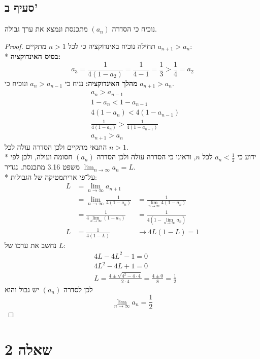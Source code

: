 \subsection{סעיף ב'}
נוכיח כי הסדרה $(a_n)$ מתכנסת ונמצא את ערך גבולה.
\begin{proof}
	תחילה נוכיח באינדוקציה כי לכל $n > 1$ מתקיים $a_{n + 1} > a_n$: \\*
	\textbf{בסיס האינדוקציה:}
	\[
		a_3 = \frac{1}{4(1 - a_2)} = \frac{1}{4 - 1} = \frac{1}{3} > \frac{1}{4} = a_2
	\]
	\textbf{מהלך האינדוקציה:}
	נניח כי $a_n > a_{n - 1}$ ונוכיח כי $a_{n + 1} > a_n$.
	\begin{align*}
		& a_n > a_{n - 1} \\
		& 1 - a_n < 1 - a_{n - 1} \\
		& 4(1 - a_n) < 4(1 - a_{n - 1}) \\
		& \frac{1}{4(1 - a_n)} > \frac{1}{4(1 - a_{n - 1})} \\
		& a_{n + 1} > a_n
	\end{align*}
	התנאי מתקיים ולכן הסדרה עולה לכל $n > 1$. \\*
	ידוע כי $a_n < \frac{1}{2}$ לכל $n$, וראינו כי הסדרה עולה ולכן הסדרה $(a_n)$ חסומה ועולה, ולכן לפי משפט 3.16 מתכנסת.
	נגדיר $\lim_{n \to \infty} a_n = L$. \\*
	על־פי אריתמטיקה של הגבולות:
	\begin{align*}
		L & = \lim_{n \to \infty} a_{n + 1} \\
		  & = \lim_{n \to \infty} \frac{1}{4(1 - a_n)}
		  & = \frac{1}{\displaystyle\lim_{n \to \infty} 4(1 - a_n)} \\
		  & = \frac{1}{4 \displaystyle\lim_{n \to \infty} (1 - a_n)}
		  & = \frac{1}{4 (1 - \displaystyle\lim_{n \to \infty} a_n)} \\
		L & = \frac{1}{4 (1 - L)}
		  & \rightarrow 4L(1 - L) = 1
	\end{align*}
	נחשב את ערכו של $L$:
	\begin{align*}
		& 4L - 4L^2 - 1 = 0 \\
		& 4L^2 - 4L + 1 = 0 \\
		& L = \frac{4 \pm \sqrt{4^2 - 4 \cdot 4}}{2 \cdot 4} = \frac{4 \pm 0}{8} = \frac{1}{2}
	\end{align*}
	לכן לסדרה $(a_n)$ יש גבול והוא
	\[
		\lim_{n \to \infty} a_n = \frac{1}{2}
	\]
\end{proof}

\section{שאלה 2}
